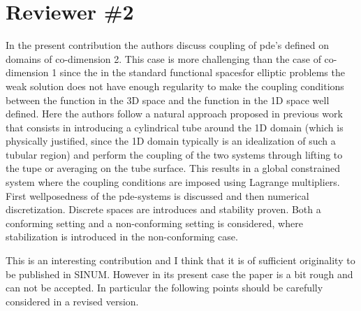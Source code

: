 \documentclass{article}
\begin{document}
\section*{Reviewer \#2}

In the present contribution the authors discuss coupling of pde's
defined on domains of co-dimension 2. This case is more challenging
than the case of co-dimension 1 since the in the standard functional
spacesfor elliptic problems the weak solution does not
have enough regularity to make the coupling conditions between the
function in the 3D space and the function in the 1D space well
defined. Here the authors follow a natural approach proposed in previous
work that consists in introducing a cylindrical tube
around the 1D domain (which is physically justified, since the 1D
domain typically is an idealization of such a tubular region) and perform
the coupling of the two systems through lifting to the tupe or
averaging on the tube surface. This results in a global constrained
system where the coupling conditions are imposed using Lagrange
multipliers.
First wellposedness of the pde-systems is discussed and then numerical
discretization. Discrete spaces are introduces and stability
proven. Both a conforming setting and a non-conforming setting is
considered, where stabilization is introduced in the non-conforming
case.

This is an interesting contribution and I think that it is of
sufficient originality to be published in SINUM. However in its
present case the paper is a bit rough and can not be accepted. In particular the following
points should be carefully considered in a revised version.
\end{document}
